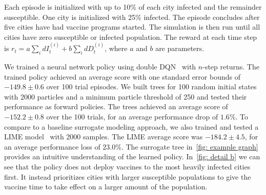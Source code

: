 \documentclass[letterpaper]{article} %
\begin{document}
Each episode is initialized with up to 10\% of each city infected and the remainder susceptible.
One city is initialized with 25\% infected.
The episode concludes after five cities have had vaccine programs started.
The simulation is then run until all cities have zero susceptible or infected population.
The reward at each time step is $ r_t = a \sum_i dI^{(i)}_t + b \sum_i dD^{(i)}_t $, where $a$ and $b$ are parameters.

We trained a neural network policy using double DQN~\cite{hasselt2010} with $n$-step returns.
The trained policy achieved an average score with one standard error bounds of $-149.8 \pm 0.6$ over 100 trial episodes.
We built trees for 100 random initial states with 2000 particles and a minimum particle threshold of 250 and tested their performance as forward policies.
The trees achieved an average score of $-152.2 \pm 0.8$ over the 100 trials, for an average performance drop of $1.6 \%$.
To compare to a baseline surrogate modeling approach, we also trained and tested a LIME model~\cite{ribeiro2016} with 2000 samples.
The LIME average score was $-184.2 \pm 4.5$, for an average performance loss of $23.0 \%$.  The surrogate tree in~\cref{fig: example graph} provides an intuitive understanding of the learned policy.
In~\cref{fig: detail b} we can see that the policy does not deploy vaccines to the most heavily infected cities first.
It instead prioritizes cities with larger susceptible populations to give the vaccine time to take effect on a larger amount of the population.
\vspace{-1.44mm}
\end{document}
